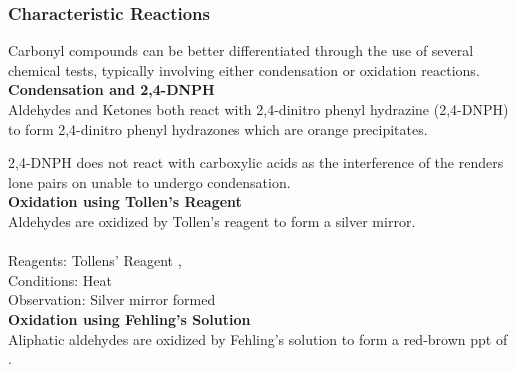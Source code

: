 \documentclass[../main]{subfiles}
\begin{document}
	\subsubsection{Characteristic Reactions}

	Carbonyl compounds can be better differentiated through the use of several chemical tests, typically involving either condensation or oxidation reactions. \\

	\noindent \textbf{Condensation and 2,4-DNPH} \\

	Aldehydes and Ketones both react with 2,4-dinitro phenyl hydrazine (2,4-DNPH) to form 2,4-dinitro phenyl hydrazones which are orange precipitates.


	\vspace{12pt}

	2,4-DNPH does not react with carboxylic acids as the interference of the  renders lone pairs on  unable to undergo condensation. \\

	\noindent \textbf{Oxidation using Tollen's Reagent} \\

	Aldehydes are oxidized by Tollen's reagent to form a silver mirror. \\

	 \\

	Reagents: Tollens' Reagent \ch{[Ag(NH3)2]+},  \\
	Conditions: Heat \\
	Observation: Silver mirror formed \\

	\noindent \textbf{Oxidation using Fehling's Solution} \\

	Aliphatic aldehydes are oxidized by Fehling's solution to form a red-brown ppt of . \\

	 \\
\end{document}
